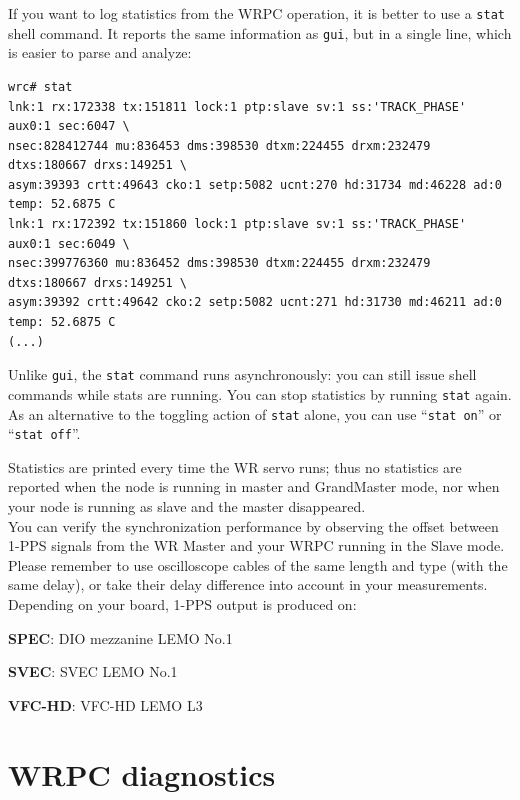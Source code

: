 \documentclass[a4paper, 12pt]{article}
\renewcommand{\_}{\underscore\allowbreak}
\begin{document}
If you want to log statistics from the WRPC operation, it is better to use a
\texttt{stat} shell command. It reports the same information as \texttt{gui},
but in a single line, which is easier to parse and analyze:

\begin{lstlisting}
wrc# stat
lnk:1 rx:172338 tx:151811 lock:1 ptp:slave sv:1 ss:'TRACK_PHASE' aux0:1 sec:6047 \
nsec:828412744 mu:836453 dms:398530 dtxm:224455 drxm:232479 dtxs:180667 drxs:149251 \
asym:39393 crtt:49643 cko:1 setp:5082 ucnt:270 hd:31734 md:46228 ad:0 temp: 52.6875 C
lnk:1 rx:172392 tx:151860 lock:1 ptp:slave sv:1 ss:'TRACK_PHASE' aux0:1 sec:6049 \
nsec:399776360 mu:836452 dms:398530 dtxm:224455 drxm:232479 dtxs:180667 drxs:149251 \
asym:39392 crtt:49642 cko:2 setp:5082 ucnt:271 hd:31730 md:46211 ad:0 temp: 52.6875 C
(...)
\end{lstlisting}

\vspace{1em}
Unlike \texttt{gui}, the \texttt{stat} command runs asynchronously: you can still
issue shell commands while stats are running. You can stop statistics by running
\texttt{stat} again. As an alternative to the toggling action of \texttt{stat}
alone, you can use ``\texttt{stat on}'' or ``\texttt{stat off}''.

Statistics are printed every time the WR servo runs; thus no statistics
are reported when the node is running in master and GrandMaster mode, nor when your node
is running as slave and the master disappeared.\\

You can verify the synchronization performance by observing the offset between
1-PPS signals from the WR Master and your WRPC running in the Slave mode. Please
remember to use oscilloscope cables of the same length and type (with the same
delay), or take their delay difference into account in your measurements.
Depending on your board, 1-PPS output is produced on:
\begin{itemize*}
  \item \textbf{SPEC}: DIO mezzanine LEMO No.1
  \item \textbf{SVEC}: SVEC LEMO No.1
  \item \textbf{VFC-HD}: VFC-HD LEMO L3
\end{itemize*}

\newpage
\section{WRPC diagnostics}
\end{document}

